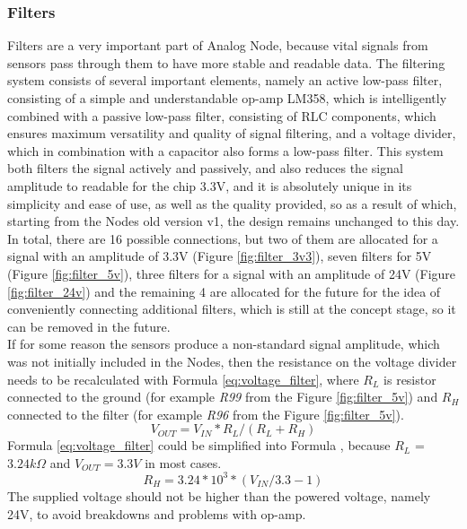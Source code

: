\documentclass[10pt]{datasheet}
\begin{document}
\subsubsection{Filters}
\label{sssec:filters}
Filters are a very important part of Analog Node, because vital signals from sensors pass through them to have more stable and readable data. The filtering system consists of several important elements, namely an active low-pass filter, consisting of a simple and understandable op-amp LM358\cite{ref17}, which is intelligently combined with a passive low-pass filter, consisting of RLC components, which ensures maximum versatility and quality of signal filtering, and a voltage divider, which in combination with a capacitor also forms a low-pass filter. This system both filters the signal actively and passively, and also reduces the signal amplitude to readable for the chip 3.3V, and it is absolutely unique in its simplicity and ease of use, as well as the quality provided, so as a result of which, starting from the Nodes old version v1, the design remains unchanged to this day. \\ 
In total, there are 16 possible connections, but two of them are allocated for a signal with an amplitude of 3.3V (Figure \ref{fig:filter_3v3}), seven filters for 5V (Figure \ref{fig:filter_5v}), three filters for a signal with an amplitude of 24V (Figure \ref{fig:filter_24v}) and the remaining 4 are allocated for the future for the idea of conveniently connecting additional filters, which is still at the concept stage, so it can be removed in the future. \\
If for some reason the sensors produce a non-standard signal amplitude, which was not initially included in the Nodes, then the resistance on the voltage divider needs to be recalculated with Formula \ref{eq:voltage_filter}, where $R_L$ is resistor connected to the ground (for example \textit{R99} from the Figure \ref{fig:filter_5v}) and $R_H$ connected to the filter (for example \textit{R96} from the Figure \ref{fig:filter_5v}).
\begin{equation}
\label{eq:voltage_filter}
V_{OUT}=V_{IN}*R_L/(R_L+R_H)
\end{equation}
Formula \ref{eq:voltage_filter} could be simplified into Formula , because $R_L$ = $3.24k\Omega$ and $V_{OUT} = 3.3V$ in most cases.
\begin{equation}
R_H=3.24*10^3*(V_{IN}/3.3-1)
\end{equation}
The supplied voltage should not be higher than the powered voltage, namely 24V, to avoid breakdowns and problems with op-amp. 
\end{document}
